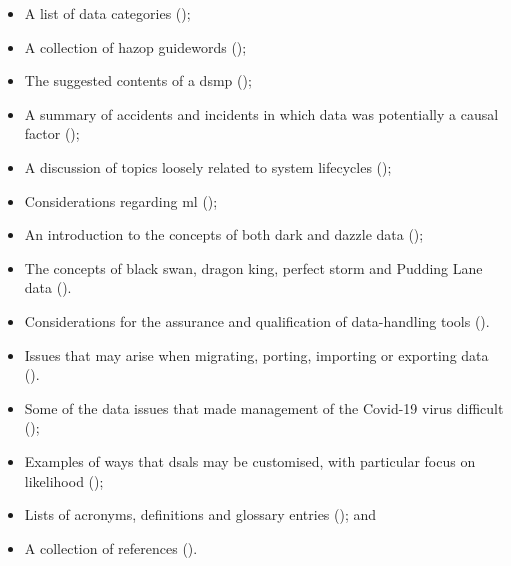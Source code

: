 \begin{itemize}
\begin{itemize}
      \item A list of data categories ();
      \item A collection of \gls{hazop} guidewords ();
      \item The suggested contents of a \gls{dsmp} ();
      \item A summary of accidents and incidents in which data was potentially a causal factor ();
      \item A discussion of topics loosely related to system lifecycles ();
      \item Considerations regarding \gls{ml} ();
      \item An introduction to the concepts of both dark and dazzle data ();
      \item The concepts of black swan, dragon king, perfect storm and Pudding Lane data ().
      \item Considerations for the assurance and qualification of data-handling tools ().
      \item Issues that may arise when migrating, porting, importing or exporting data ().            
      \item Some of the data issues that made management of the Covid-19 virus difficult ();
      \item Examples of ways that \glspl{dsal} may be customised, with particular focus on likelihood ();
      \item Lists of acronyms, definitions and glossary entries (); and
      \item A collection of references ().
    \end{itemize}
\end{itemize}

